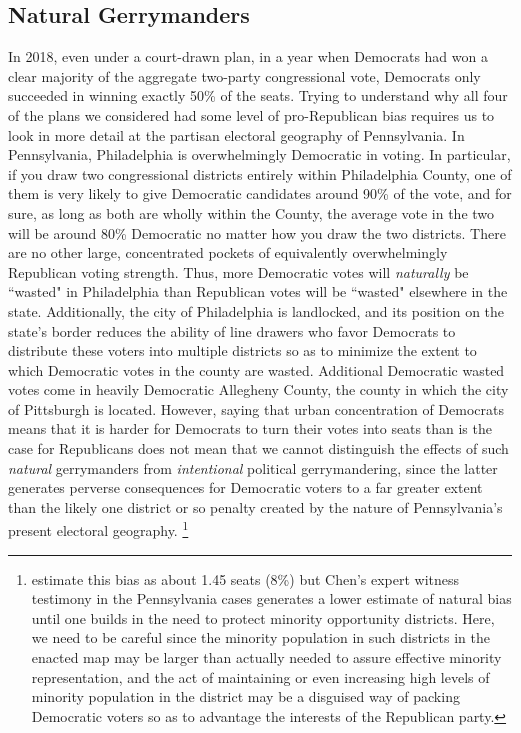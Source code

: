     \subsection*{Natural Gerrymanders}
    In 2018, even under a court-drawn plan, in a year when Democrats had won a clear majority of the aggregate two-party congressional vote, Democrats only succeeded in winning exactly 50\% of the seats. Trying to understand why all four of the plans we considered had some level of pro-Republican bias requires us to look in more detail at the partisan electoral geography of Pennsylvania. In Pennsylvania, Philadelphia is overwhelmingly Democratic in voting. In particular, if you draw two congressional districts entirely within Philadelphia County, one of them is very likely to give Democratic candidates around 90\% of the vote, and for sure, as long as both are wholly within the County, the average vote in the two will be around 80\% Democratic no matter how you draw the two districts. There are no other large, concentrated pockets of equivalently overwhelmingly Republican voting strength. Thus, more Democratic votes will \textit{naturally} be ``wasted" in Philadelphia than Republican votes will be ``wasted" elsewhere in the state. Additionally, the city of Philadelphia is landlocked, and its position on the state's border reduces the ability of line drawers who favor Democrats to distribute these voters into multiple districts so as to minimize the extent to which Democratic votes in the county are wasted. Additional Democratic wasted votes come in heavily Democratic Allegheny County, the county in which the city of Pittsburgh is located. However, saying that urban concentration of Democrats means that it is harder for Democrats to turn their votes into seats than is the case for Republicans does not mean that we cannot distinguish the effects of such \textit{natural} gerrymanders from \textit{intentional} political gerrymandering, since the latter generates perverse consequences for Democratic voters to a far greater extent than the likely one district or so penalty created by the nature of Pennsylvania’s present electoral geography. 
    \footnote{\citet{Chen2013} estimate this bias as about 1.45 seats (8\%) but Chen’s expert witness testimony in the Pennsylvania cases generates a lower estimate of natural bias until one builds in the need to protect minority opportunity districts. Here, we need to be careful since the minority population in such districts in the enacted map may be larger than actually needed to assure effective minority representation, and the act of  maintaining or even increasing high levels of minority population in the district may be a disguised way of packing Democratic voters so as to advantage the interests of the Republican party.}
